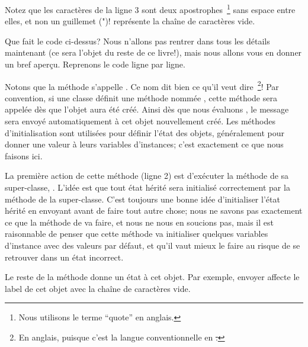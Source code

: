\documentclass[a4paper,10pt,twoside]{book}
\begin{document}
\noindent
Notez que les caractères  de la ligne 3 sont deux
apostrophes~\footnote{Nous utilisons le terme ``quote'' en anglais.} 
sans espace entre elles, et non un guillemet (")!
 représente la chaîne de caractères vide.


Que fait le code ci-dessus?  Nous n'allons pas rentrer dans tous les
détails maintenant (ce sera l'objet du reste de ce livre!), mais nous
allons vous en donner un bref aperçu. Reprenons le code ligne par ligne.

Notons que la méthode s'appelle .
Ce nom dit bien ce qu'il veut dire~\footnote{En anglais, puisque c'est
  la langue conventionnelle en \st.}!
Par convention, si une classe définit une méthode nommée
, cette méthode sera appelée dès que l'objet aura été créé.
Ainsi dès que nous évaluons , le message  sera envoyé automatiquement à cet objet nouvellement créé.
Les méthodes d'initialisation sont utilisées pour définir l'état des objets, généralement pour donner une valeur à leurs variables d'instances; c'est exactement ce que nous faisons ici.

La première action de cette méthode (ligne 2) est d'exécuter la méthode  de sa super-classe, .
L'idée est que tout état hérité sera initialisé correctement par la méthode  de la super-classe.
C'est toujours une bonne idée d'initialiser l'état hérité en envoyant
 avant de faire tout autre chose; nous ne savons
pas exactement ce que la méthode  de
 va faire, et nous ne nous en soucions pas, mais
il est raisonnable de penser que cette méthode va initialiser quelques
variables d'instance avec des valeurs par défaut, et qu'il vaut mieux
le faire au risque de se retrouver dans un état incorrect.

Le reste de la méthode donne un état à cet objet.
Par exemple, envoyer  affecte le label de cet objet avec la chaîne de caractères vide.
\end{document}
